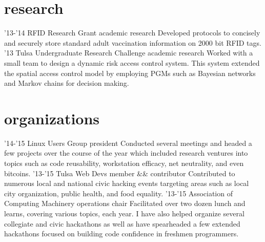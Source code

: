 \documentclass[]{friggeri-cv}
\begin{document}
\section{research}

\begin{entrylist}
  \entry
    {'13-'14}
    {RFID Research Grant}
    {academic research}
    {Developed protocols to concisely and securely store standard adult vaccination information on 2000 bit RFID tags.}
  \entry
    {'13}
    {Tulsa Undergraduate Research Challenge}
    {academic research}
    {Worked with a small team to design a dynamic risk access control system. This system extended the spatial access control model by employing PGMs such as Bayesian networks and Markov chains for decision making.}
\end{entrylist}

\section{organizations}

\begin{entrylist}
  \entry
    {'14-'15}
    {Linux Users Group}
    {president}
    {Conducted several meetings and headed a few projects over the course of the year which included research ventures into topics such as code reusability, workstation efficacy, net neutrality, and even bitcoins.}
  \entry
    {'13-'15}
    {Tulsa Web Devs}
    {member \&\& contributor}
    {Contributed to numerous local and national civic hacking events targeting areas such as local city organization, public health, and food equality.}
  \entry
    {'13-'15}
    {Association of Computing Machinery}
    {operations chair}
    {Facilitated over two dozen lunch and learns, covering various topics, each year. I have also helped organize several collegiate and civic hackathons as well as have spearheaded a few extended hackathons focused on building code confidence in freshmen programmers.}
\end{entrylist}
\end{document}
